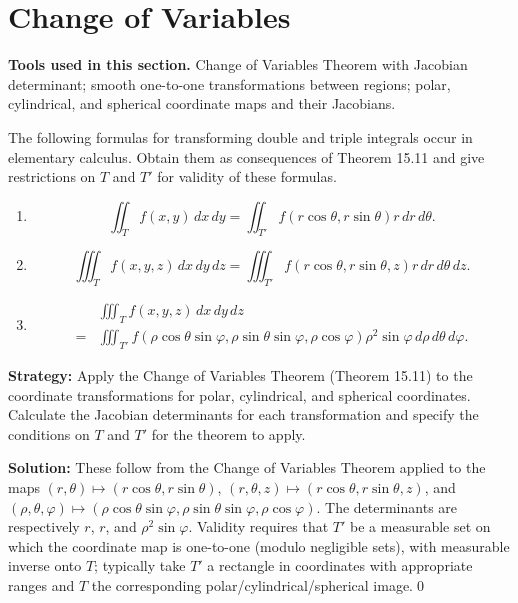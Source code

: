 \section{Change of Variables}

\noindent\textbf{Tools used in this section.} Change of Variables Theorem with Jacobian determinant; smooth one-to-one transformations between regions; polar, cylindrical, and spherical coordinate maps and their Jacobians.



\begin{problembox}
The following formulas for transforming double and triple integrals occur in elementary calculus. Obtain them as consequences of Theorem 15.11 and give restrictions on \( T \) and \( T' \) for validity of these formulas.
\begin{enumerate}[label=(\alph*)]
\item \[ \iint_T f(x, y) \, dx \, dy = \iint_{T'} f(r \cos \theta, r \sin \theta)r \, dr \, d\theta.\]
\item \[ \iiint_T f(x, y, z) \, dx \, dy \, dz = \iiint_{T'} f(r \cos \theta, r \sin \theta, z)r \, dr \, d\theta \, dz.\]
\item 
\begin{align*}
&\iiint_T f(x, y, z) \, dx \, dy \, dz \\
=& \iiint_{T'} f(\rho \cos \theta \sin \varphi, \rho \sin \theta \sin \varphi, \rho \cos \varphi) \rho^2 \sin \varphi \, d\rho \, d\theta \, d\varphi.
\end{align*}
\end{enumerate}
\end{problembox}

\noindent\textbf{Strategy:} Apply the Change of Variables Theorem (Theorem 15.11) to the coordinate transformations for polar, cylindrical, and spherical coordinates. Calculate the Jacobian determinants for each transformation and specify the conditions on \(T\) and \(T'\) for the theorem to apply.

\bigskip\noindent\textbf{Solution:}
These follow from the Change of Variables Theorem applied to the maps
\( (r,\theta)\mapsto (r\cos\theta, r\sin\theta) \),
\( (r,\theta,z)\mapsto (r\cos\theta, r\sin\theta, z) \), and
\( (\rho,\theta,\varphi)\mapsto (\rho\cos\theta\sin\varphi,\rho\sin\theta\sin\varphi,\rho\cos\varphi) \).
The determinants are respectively \(r\), \(r\), and \(\rho^2\sin\varphi\). Validity requires that \(T'\) be a measurable set on which the coordinate map is one-to-one (modulo negligible sets), with measurable inverse onto \(T\); typically take \(T'\) a rectangle in coordinates with appropriate ranges and \(T\) the corresponding polar/cylindrical/spherical image.\qed
